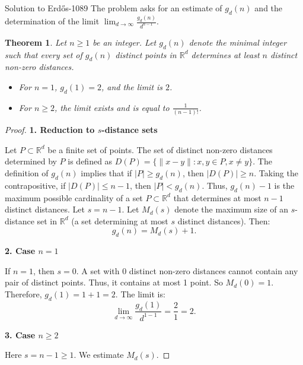 \documentclass{article}
\theoremstyle{plain}
\newtheorem{theorem}{Theorem}
\theoremstyle{definition}
\begin{document}
\begin{solution}{Solution to Erdős-1089}
The problem asks for an estimate of $g_d(n)$ and the determination of the limit $\lim_{d\to \infty}\frac{g_d(n)}{d^{n-1}}$.

\begin{theorem}
Let $n \ge 1$ be an integer. Let $g_d(n)$ denote the minimal integer such that every set of $g_d(n)$ distinct points in $\mathbb{R}^d$ determines at least $n$ distinct non-zero distances.
\begin{itemize}
    \item For $n=1$, $g_d(1) = 2$, and the limit is $2$.
    \item For $n \ge 2$, the limit exists and is equal to $\frac{1}{(n-1)!}$.
\end{itemize}
\end{theorem}

\begin{proof} 

\textbf{1. Reduction to $s$-distance sets}

Let $P \subset \mathbb{R}^d$ be a finite set of points. The set of distinct non-zero distances determined by $P$ is defined as $D(P) = \{ \|x-y\| : x,y \in P, x \neq y \}$.
The definition of $g_d(n)$ implies that if $|P| \ge g_d(n)$, then $|D(P)| \ge n$.
Taking the contrapositive, if $|D(P)| \le n-1$, then $|P| < g_d(n)$.
Thus, $g_d(n) - 1$ is the maximum possible cardinality of a set $P \subset \mathbb{R}^d$ that determines at most $n-1$ distinct distances.
Let $s = n-1$. Let $M_d(s)$ denote the maximum size of an $s$-distance set in $\mathbb{R}^d$ (a set determining at most $s$ distinct distances).
Then:
\[ g_d(n) = M_d(s) + 1. \]

\textbf{2. Case $n=1$}

If $n=1$, then $s=0$.
A set with 0 distinct non-zero distances cannot contain any pair of distinct points. Thus, it contains at most 1 point.
So $M_d(0) = 1$.
Therefore, $g_d(1) = 1 + 1 = 2$.
The limit is:
\[ \lim_{d\to \infty} \frac{g_d(1)}{d^{1-1}} = \frac{2}{1} = 2. \]

\textbf{3. Case $n \ge 2$}

Here $s = n-1 \ge 1$. We estimate $M_d(s)$.


\end{proof}
\end{solution}
\end{document}
